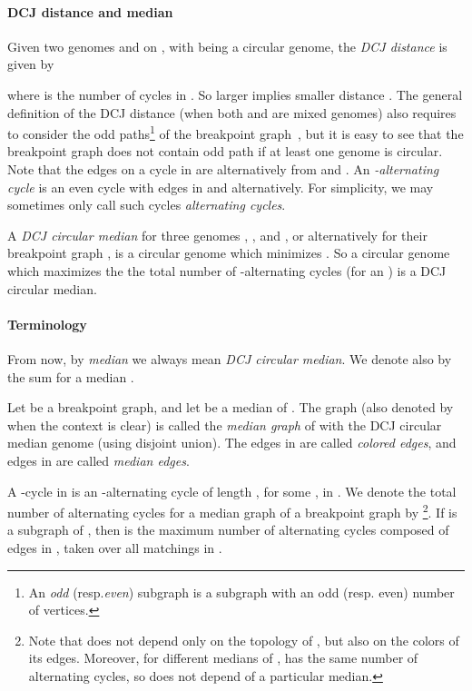 \documentclass[10pt]{llncs}
\begin{document}
\paragraph{DCJ distance and median}
Given two genomes  and  on , with  being a circular
genome, the {\em DCJ distance}  is given by

where  is the number of cycles in . So larger  implies smaller distance . The general definition
of the DCJ distance (when both  and  are mixed genomes) also
requires to consider the odd paths\footnote{ An \emph{odd}
  (resp.\emph{even}) subgraph is a subgraph with an odd (resp. even)
  number of vertices.} of the breakpoint graph~\cite{Bergeron2006},
but it is easy to see that the breakpoint graph does not contain odd
path if at least one genome is circular. Note that the edges on a
cycle in  are alternatively from  and . An \emph{-alternating cycle} is an even cycle with edges in  and 
alternatively. For simplicity, we may sometimes only call such cycles
\emph{alternating cycles}.

A {\em DCJ circular median} for three genomes , , and ,
or alternatively for their breakpoint graph , is a
circular genome  which minimizes 
. So a circular genome  which maximizes the the
total number of -alternating cycles (for an  ) is a DCJ circular median.

\paragraph{Terminology}
From now, by \emph{median} we always mean \emph{DCJ circular median}.
We denote also by  the sum  for a median .

Let  be a breakpoint graph, and let  be a
median of .  The graph  (also denoted
by  when the context is clear) is called the \emph{median graph}
of  with the DCJ circular median genome  (using disjoint union).
The edges in  are called {\em colored
  edges}, and edges in  are called {\em median
  edges}. 

A -cycle in  is an -alternating cycle of length ,
for some , in . We denote the total number of alternating
cycles for a median graph  of a breakpoint graph  by
\footnote{Note that  does not depend
  only on the topology of , but also on the colors of its
  edges. Moreover, for different medians  of ,  has the
  same number of alternating cycles, so  does not
  depend of a particular median.}.  If  is a subgraph of , then
 is the maximum number of alternating cycles composed
of edges in , taken over all matchings in .
\end{document}
